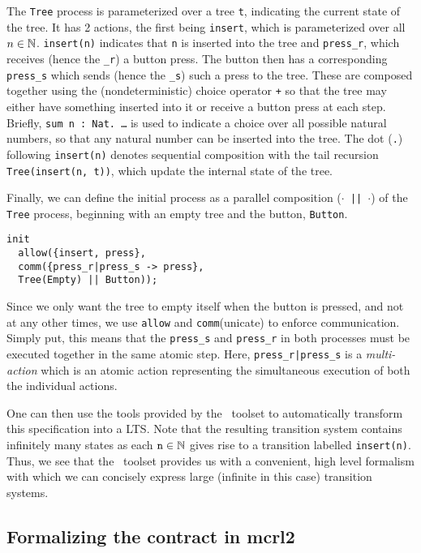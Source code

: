 \documentclass{article}
\begin{document}
The \texttt{Tree} process is parameterized over a tree \texttt{t}, indicating
the current state of the tree.
It has 2 actions, the first being \texttt{insert},  which is parameterized over
all $n \in \operatorname{\mathbb{N}}$.
\texttt{insert(n)} indicates that \texttt{n} is inserted into the
tree and \texttt{press\_r}, which receives (hence the \texttt{\_r}) a button
press.
The button then has a corresponding \texttt{press\_s} which sends
(hence the \texttt{\_s}) such a press to the tree.
These are composed together using the (nondeterministic) choice operator
\texttt{+} so that the
tree may either have something inserted into it or receive a button press at
each step.
Briefly, \texttt{sum n : Nat. \dots} is used to indicate a
choice over all possible natural numbers, so that any natural number can be
inserted into the tree.
The dot (\texttt{.}) following \texttt{insert(n)} denotes sequential composition
with the tail recursion \texttt{Tree(insert(n, t))}, which  update the internal
state of the tree.

Finally, we can define the initial process as a parallel composition
(\texttt{$\cdot$ || $\cdot$}) of the \texttt{Tree} process, beginning with an
empty tree and the button, \texttt{Button}.

\begin{verbatim}
init
  allow({insert, press},
  comm({press_r|press_s -> press},
  Tree(Empty) || Button));
\end{verbatim}

Since we only want the tree to empty itself when the button is pressed, and
not at any other times, we use \texttt{allow} and \texttt{comm}(unicate) to
enforce communication.
Simply put, this means that the \texttt{press\_s} and \texttt{press\_r} in both
processes must be executed together in the same atomic step.
Here, \texttt{press\_r|press\_s} is a \textit{multi-action} which is an atomic
action representing the simultaneous execution of both the individual actions.

One can then use the tools provided by the \mcrl \, toolset to automatically
transform this specification into a LTS.
Note that the resulting transition system contains infinitely many states as
each $\mathtt{n} \in \operatorname{\mathbb{N}}$ gives rise to a transition labelled \texttt{insert(n)}.
Thus, we see that the \mcrl \, toolset provides us with a convenient, high level
formalism with which we can concisely express large (infinite in this case)
transition systems.

\subsection{Formalizing the contract in mcrl2}
\end{document}
